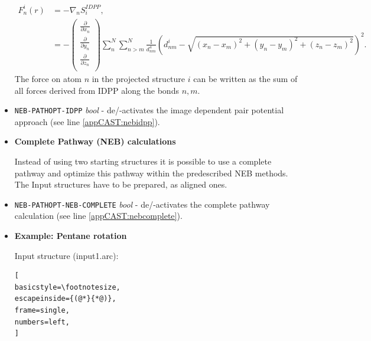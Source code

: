 \documentclass[a4paper,11pt]{scrartcl}
\begin{document}
\begin{itemize}
\begin{equation}
\begin{aligned}
F^{i}_{n}(r) &=-\nabla_{n}S^{IDPP}_{i}, \\
						 &= -\left(\begin{matrix}
												\frac{\partial}{\partial x_{n}} \\
												\frac{\partial}{\partial y_{n}} \\
												\frac{\partial}{\partial z_{n}}  \\
											\end{matrix} \right) \sum^{N}_{n}\sum^{N}_{n>m} \frac{1}{d^{4}_{nm}} \left(d^{i}_{nm}-\sqrt{\left(x_{n}-x_{m}\right)^{2}+\left(y_{n}-y_{m}\right)^{2}+\left(z_{n}-z_{m}\right)^{2}}\right)^{2}.
\end{aligned}											
\end{equation}
The force on atom $n$ in the projected structure $i$ can be written as the sum of all forces derived from IDPP along the bonds $n,m$. 

\item \texttt{NEB-PATHOPT-IDPP} \textit{bool} - de/-activates the image dependent pair potential approach (see line \ref{appCAST:nebidpp}).

\item \textbf{Complete Pathway (NEB) calculations}
 
Instead of using two starting structures it is possible to use a complete pathway and optimize this pathway within the predescribed NEB methods.
The Input structures have to be prepared, as aligned ones.

\item \texttt{NEB-PATHOPT-NEB-COMPLETE} \textit{bool} - de/-activates the complete pathway calculation (see line \ref{appCAST:nebcomplete}).

\item \textbf{Example: Pentane rotation}

Input structure (input1.arc): \newline

\begin{lstlisting}[
basicstyle=\footnotesize,
escapeinside={(@*}{*@)},
frame=single,
numbers=left,
]


\end{lstlisting}
\end{itemize}
\end{document}
